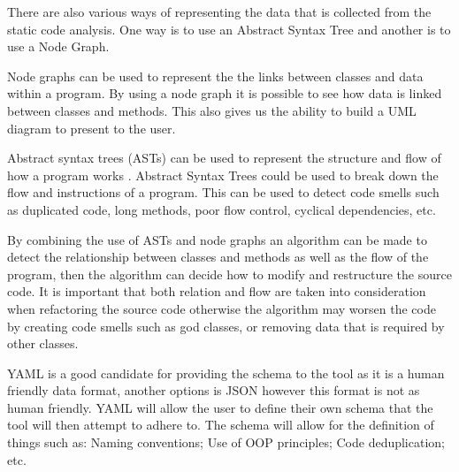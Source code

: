 There are also various ways of representing the data that is collected from the static code analysis. One way is to use an Abstract Syntax Tree \citep{8802820} and another is to use a Node Graph.

Node graphs can be used to represent the the links between classes and data within a program. By using a node graph it is possible to see how data is linked between classes and methods. This also gives us the ability to build a UML diagram to present to the user.

Abstract syntax trees (ASTs) can be used to represent the structure and flow of how a program works \citep{8802820}. Abstract Syntax Trees could be used to break down the flow and instructions of a program. This can be used to detect code smells such as duplicated code, long methods, poor flow control, cyclical dependencies, etc.

By combining the use of ASTs and node graphs an algorithm can be made to detect the relationship between classes and methods as well as the flow of the program, then the algorithm can decide how to modify and restructure the source code. It is important that both relation and flow are taken into consideration when refactoring the source code otherwise the algorithm may worsen the code by creating code smells such as god classes, or removing data that is required by other classes.

YAML is a good candidate for providing the schema to the tool as it is a human friendly data format, another options is JSON however this format is not as human friendly. YAML will allow the user to define their own schema that the tool will then attempt to adhere to. The schema will allow for the definition of things such as: Naming conventions; Use of OOP principles; Code deduplication; etc.